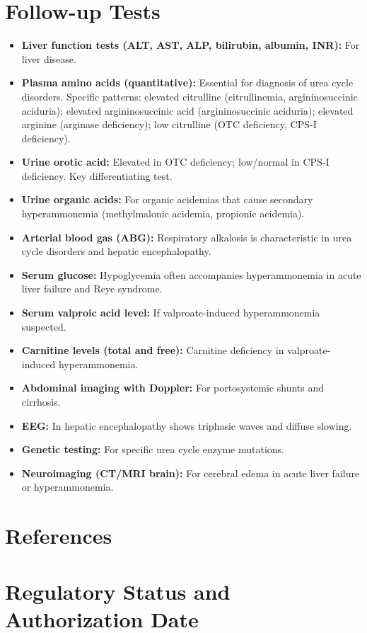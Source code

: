 \section*{Follow-up Tests}
\begin{itemize}
  \item \textbf{Liver function tests (ALT, AST, ALP, bilirubin, albumin, INR):} For liver disease.
  \item \textbf{Plasma amino acids (quantitative):} Essential for diagnosis of urea cycle disorders. Specific patterns: elevated citrulline (citrullinemia, argininosuccinic aciduria); elevated argininosuccinic acid (argininosuccinic aciduria); elevated arginine (arginase deficiency); low citrulline (OTC deficiency, CPS-I deficiency).
  \item \textbf{Urine orotic acid:} Elevated in OTC deficiency; low/normal in CPS-I deficiency. Key differentiating test.
  \item \textbf{Urine organic acids:} For organic acidemias that cause secondary hyperammonemia (methylmalonic acidemia, propionic acidemia).
  \item \textbf{Arterial blood gas (ABG):} Respiratory alkalosis is characteristic in urea cycle disorders and hepatic encephalopathy.
  \item \textbf{Serum glucose:} Hypoglycemia often accompanies hyperammonemia in acute liver failure and Reye syndrome.
  \item \textbf{Serum valproic acid level:} If valproate-induced hyperammonemia suspected.
  \item \textbf{Carnitine levels (total and free):} Carnitine deficiency in valproate-induced hyperammonemia.
  \item \textbf{Abdominal imaging with Doppler:} For portosystemic shunts and cirrhosis.
  \item \textbf{EEG:} In hepatic encephalopathy shows triphasic waves and diffuse slowing.
  \item \textbf{Genetic testing:} For specific urea cycle enzyme mutations.
  \item \textbf{Neuroimaging (CT/MRI brain):} For cerebral edema in acute liver failure or hyperammonemia.
\end{itemize}

\section*{References}



\clearpage
\section*{Regulatory Status and Authorization Date}

\clearpage
